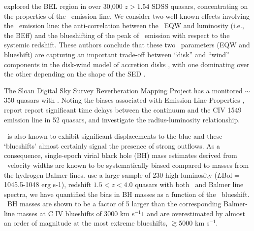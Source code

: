 \documentclass[a4paper,fleqn,usenatbib]{mnras}
\begin{document}
\citet{Richards2011} explored the BEL region in over 30,000 $z > 1.54$ SDSS
quasars, concentrating on the properties of the \civ\ emission
line. We consider two well-known effects involving the \civ\ emission
line: the anti-correlation between the \civ\ EQW and luminosity (i.e.,
the BEff) and the blueshifting of the peak of \civ\ emission with
respect to the systemic redshift. These authors conclude that these
two \civ\ parameters (EQW and blueshift) are capturing an important
trade-off between ``disk'' and ``wind'' components in the disk-wind
model of accretion disks \citep[e.g.,][]{Murray1995, Elvis2000,
Proga2000}, with one dominating over the other depending on the shape
of the SED \citep[][strong \civ\ EQW indicates a more ionizing SED and
large \civ\ blueshift indicating a less ionizing SED ]{Leighly2004b}.

The Sloan Digital Sky Survey Reverberation Mapping Project
\cite[SDSS-RM; ][]{Shen2015} has a monitored $\sim$350 quasars with
\civ. Noting the biases associated with \civ Emission Line Properties
\citep[e.g. increasing systematic offsets with decreasing
signal-to-noise][]{Denney2016}, \citet{Grier2019} report report
significant time delays between the continuum and the CIV 1549
emission line in 52 quasars, and investigate the \civ
radius-luminosity relationship.

\civ\ is also known to exhibit significant displacements to the
blue and these `blueshifts' almost certainly signal the presence of
strong outflows. As a consequence, single-epoch virial black hole (BH)
mass estimates derived from \civ\ velocity widths are known to be
systematically biased compared to masses from the hydrogen Balmer
lines. \citet{Coatman2017} use a large sample of 230 high-luminosity
($L$Bol = 1045.5-1048 erg s-1), redshift $1.5 < z < 4.0$ quasars with
both \civ\ and Balmer line spectra, we have quantified the bias in \civ
BH masses as a function of the \civ\ blueshift. \civ\ BH masses are
shown to be a factor of 5 larger than the corresponding Balmer-line
masses at C IV blueshifts of 3000 km s$^{-1}1$ and are overestimated
by almost an order of magnitude at the most extreme blueshifts,
$\gtrsim$5000 km s$^{-1}$.
\end{document}
